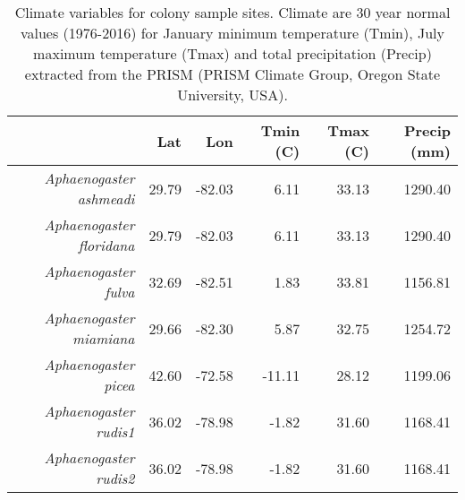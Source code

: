 \begin{table}[ht]
\centering
\begin{tabular}{rrrrrr}
  \hline
 & Lat & Lon & Tmin (C) & Tmax (C) & Precip (mm) \\ 
  \hline
{\emph{Aphaenogaster ashmeadi}} & 29.79 & -82.03 & 6.11 & 33.13 & 1290.40 \\ 
  {\emph{Aphaenogaster floridana}} & 29.79 & -82.03 & 6.11 & 33.13 & 1290.40 \\ 
  {\emph{Aphaenogaster fulva}} & 32.69 & -82.51 & 1.83 & 33.81 & 1156.81 \\ 
  {\emph{Aphaenogaster miamiana}} & 29.66 & -82.30 & 5.87 & 32.75 & 1254.72 \\ 
  {\emph{Aphaenogaster picea}} & 42.60 & -72.58 & -11.11 & 28.12 & 1199.06 \\ 
  {\emph{Aphaenogaster rudis1}} & 36.02 & -78.98 & -1.82 & 31.60 & 1168.41 \\ 
  {\emph{Aphaenogaster rudis2}} & 36.02 & -78.98 & -1.82 & 31.60 & 1168.41 \\ 
   \hline
\end{tabular}
\caption{Climate variables for colony sample sites. Climate are 30 year normal values (1976-2016) for January minimum temperature (Tmin), July maximum temperature (Tmax) and total precipitation (Precip) extracted from the PRISM (PRISM Climate Group, Oregon State University, USA).} 
\label{tab:climate}
\end{table}
